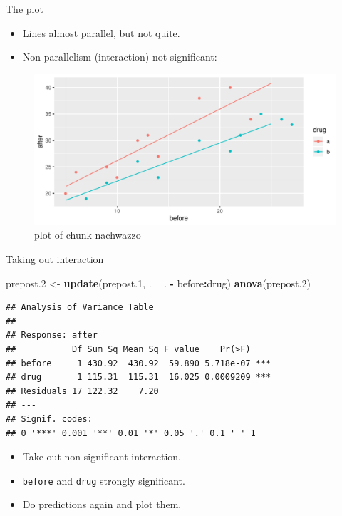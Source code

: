 \documentclass[ignorenonframetext,]{beamer}
\newenvironment{Shaded}{\begin{snugshade}}{\end{snugshade}}
\newcommand{\FloatTok}[1]{\textcolor[rgb]{0.00,0.00,0.81}{#1}}
\newcommand{\KeywordTok}[1]{\textcolor[rgb]{0.13,0.29,0.53}{\textbf{#1}}}
\newcommand{\NormalTok}[1]{#1}
\newcommand{\OperatorTok}[1]{\textcolor[rgb]{0.81,0.36,0.00}{\textbf{#1}}}
\newcommand{\StringTok}[1]{\textcolor[rgb]{0.31,0.60,0.02}{#1}}
\begin{document}
\begin{frame}{The plot}
\protect\hypertarget{the-plot-5}{}

\begin{itemize}
\item
  Lines almost parallel, but not quite.
\item
  Non-parallelism (interaction) not significant:
\end{itemize}

\begin{figure}
\centering
\includegraphics{figure/nachwazzo-1.pdf}
\caption{plot of chunk nachwazzo}
\end{figure}

\end{frame}

\begin{frame}[fragile]{Taking out interaction}
\protect\hypertarget{taking-out-interaction}{}

\small

\begin{Shaded}
\begin{Highlighting}[]
\NormalTok{prepost}\FloatTok{.2}\NormalTok{ <-}\StringTok{ }\KeywordTok{update}\NormalTok{(prepost}\FloatTok{.1}\NormalTok{, . }\OperatorTok{~}\StringTok{ }\NormalTok{. }\OperatorTok{-}\StringTok{ }\NormalTok{before}\OperatorTok{:}\NormalTok{drug)}
\KeywordTok{anova}\NormalTok{(prepost}\FloatTok{.2}\NormalTok{)}
\end{Highlighting}
\end{Shaded}

\begin{verbatim}
## Analysis of Variance Table
## 
## Response: after
##           Df Sum Sq Mean Sq F value    Pr(>F)    
## before     1 430.92  430.92  59.890 5.718e-07 ***
## drug       1 115.31  115.31  16.025 0.0009209 ***
## Residuals 17 122.32    7.20                      
## ---
## Signif. codes:  
## 0 '***' 0.001 '**' 0.01 '*' 0.05 '.' 0.1 ' ' 1
\end{verbatim}

\normalsize

\begin{itemize}
\item
  Take out non-significant interaction.
\item
  \texttt{before} and \texttt{drug} strongly significant.
\item
  Do predictions again and plot them.
\end{itemize}

\end{frame}
\end{document}
